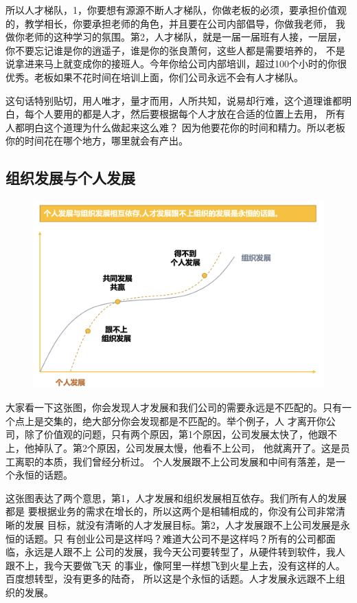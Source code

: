 \documentclass[12pt]{article}
\begin{document}
所以人才梯队，1，你要想有源源不断人才梯队，你做老板的必须，要承担价值观的，教学相长，你要承担老师的角色，并且要在公司内部倡导，你做我老师， 我做你老师的这种学习的氛围。第2，人才梯队，就是一届一届班有人接，一层层，你不要忘记谁是你的逍遥子，谁是你的张良萧何，这些人都是需要培养的， 不是说拿进来马上就变成你的接班人。今年你给公司内部培训，超过100个小时的你很优秀。老板如果不花时间在培训上面，你们公司永远不会有人才梯队。

这句话特别贴切，用人唯才，量才而用，人所共知，说易却行难，这个道理谁都明白，每个人要用的都是人才，然后要根据每个人才放在合适的位置上去用， 所有人都明白这个道理为什么做起来这么难？ 因为他要花你的时间和精力。所以老板你的时间花在哪个地方，哪里就会有产出。

\subsection{组织发展与个人发展}
\begin{figure}[H]
    \centering
    \includegraphics[width=1\textwidth]{fig/Ali_Performance_12.png}
\end{figure}

大家看一下这张图，你会发现人才发展和我们公司的需要永远是不匹配的。只有一个点上是交集的，绝大部分你会发现都是不匹配的。举个例子，人 才离开你公司，除了价值观的问题，只有两个原因，第1个原因，公司发展太快了，他跟不上，他掉队了。第2个原因，公司发展太慢，他看不上公司， 他就离开了。这是员工离职的本质，我们曾经分析过。 个人发展跟不上公司发展和中间有落差，是一个永恒的话题。

这张图表达了两个意思，第1，人才发展和组织发展相互依存。我们所有人的发展都是 要根据业务的需求在增长的，所以这两个是相辅相成的，你没有公司非常清晰的发展 目标，就没有清晰的人才发展目标。第2，人才发展跟不上公司发展是永恒的话题。只 有创业公司是这样吗？难道大公司不是这样吗？所有的公司都面临，永远是人跟不上 公司的发展，我今天公司要转型了，从硬件转到软件，我人跟不上，我今天要做飞天 的事业，像阿里一样想飞到火星上去，没有这样的人。百度想转型，没有更多的陆奇， 所以这是个永恒的话题。人才发展永远跟不上组织的发展。
\end{document}
